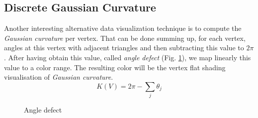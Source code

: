 \subsection{Discrete Gaussian Curvature}
\label{section:vertex-area-gaussian-curvature}
Another interesting alternative data visualization technique is to compute the \textit{Gaussian curvature} per vertex. That can be done summing up, for each vertex, angles at this vertex with adjacent triangles and then subtracting this value to $2\pi$.
After having obtain this value, called \textit{angle defect} (Fig. \ref{fig:gc-angle}), we map linearly this value to a color range.
The resulting color will be the vertex flat shading visualisation of \textit{Gaussian curvature}.
$$K(V) = 2\pi - \sum_j \theta_j$$
\begin{figure}[!h]
    \centering
    \caption{Angle defect}\label{fig:gc-angle}
\end{figure}
